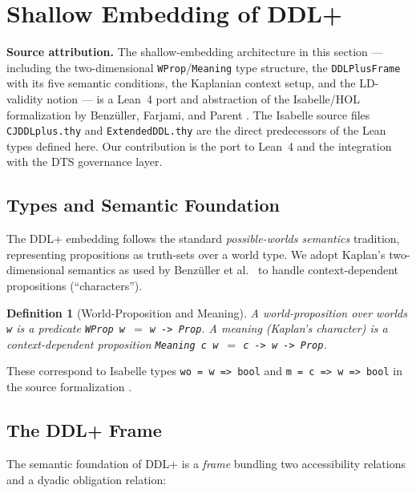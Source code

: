 \documentclass[]{article}
\newtheorem{definition}[theorem]{Definition}
\newcommand{\code}[1]{\texttt{#1}}
\newcommand{\DDL}{\textup{DDL+}}
\newcommand{\DTS}{\textup{DTS}}
\begin{document}
\section{Shallow Embedding of DDL+}
\label{sec:ddl}

\noindent
\textbf{Source attribution.}
The shallow-embedding architecture in this section --- including the
two-dimensional \code{WProp}/\code{Meaning} type structure, the
\code{DDLPlusFrame} with its five semantic conditions, the Kaplanian context
setup, and the LD-validity notion --- is a Lean~4 port and abstraction of the
Isabelle/HOL formalization by Benz{\"u}ller, Farjami, and Parent
\cite{Benzmuller2018}.  The Isabelle source files \code{CJDDLplus.thy} and
\code{ExtendedDDL.thy} are the direct predecessors of the Lean types defined
here.  Our contribution is the port to Lean~4 and the integration with the
\DTS{} governance layer.

\subsection{Types and Semantic Foundation}

The \DDL{} embedding follows the standard \emph{possible-worlds semantics}
tradition, representing propositions as truth-sets over a world type.
We adopt Kaplan's two-dimensional semantics as used by Benz{\"u}ller et al.\
\cite{Benzmuller2018,Kaplan1989} to handle context-dependent propositions
(``characters'').

\begin{definition}[World-Proposition and Meaning]
A \emph{world-proposition} over worlds \code{w} is a predicate
\code{WProp w}~$=$ \code{w -> Prop}.
A \emph{meaning} (Kaplan's character) is a context-dependent proposition
\code{Meaning c w}~$=$ \code{c -> w -> Prop}.
\end{definition}

These correspond to Isabelle types \texttt{wo = w => bool} and
\texttt{m = c => w => bool} in the source formalization \cite{Benzmuller2018}.

\subsection{The DDL+ Frame}

The semantic foundation of \DDL{} is a \emph{frame} bundling two accessibility
relations and a dyadic obligation relation:
\end{document}
